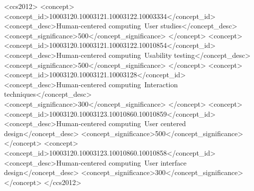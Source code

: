 \documentclass[sigconf]{acmart}
\begin{document}
\begin{CCSXML}
<ccs2012>
   <concept>
       <concept_id>10003120.10003121.10003122.10003334</concept_id>
       <concept_desc>Human-centered computing~User studies</concept_desc>
       <concept_significance>500</concept_significance>
       </concept>
   <concept>
       <concept_id>10003120.10003121.10003122.10010854</concept_id>
       <concept_desc>Human-centered computing~Usability testing</concept_desc>
       <concept_significance>500</concept_significance>
       </concept>
   <concept>
       <concept_id>10003120.10003121.10003128</concept_id>
       <concept_desc>Human-centered computing~Interaction techniques</concept_desc>
       <concept_significance>300</concept_significance>
       </concept>
   <concept>
       <concept_id>10003120.10003123.10010860.10010859</concept_id>
       <concept_desc>Human-centered computing~User centered design</concept_desc>
       <concept_significance>500</concept_significance>
       </concept>
   <concept>
       <concept_id>10003120.10003123.10010860.10010858</concept_id>
       <concept_desc>Human-centered computing~User interface design</concept_desc>
       <concept_significance>300</concept_significance>
       </concept>
 </ccs2012>
\end{CCSXML}



\maketitle

\vfill



\clearpage



\end{document}
